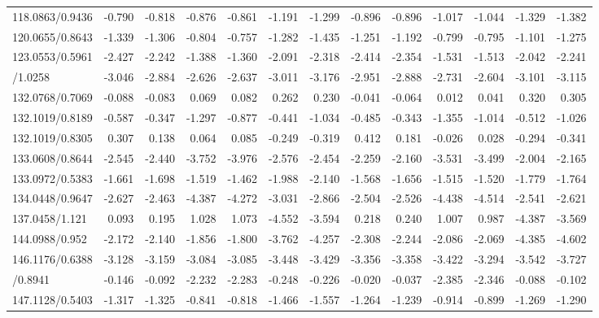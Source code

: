 \documentclass[]{elsarticle} %
\begin{document}
\begin{table}[H]
{\begin{tabular}[t]{lrrrrrrrrrrrr}
\rowcolor{gray!6}  118.0863/0.9436 & -0.790 & -0.818 & -0.876 & -0.861 & -1.191 & -1.299 & -0.896 & -0.896 & -1.017 & -1.044 & -1.329 & -1.382\\
120.0655/0.8643 & -1.339 & -1.306 & -0.804 & -0.757 & -1.282 & -1.435 & -1.251 & -1.192 & -0.799 & -0.795 & -1.101 & -1.275\\
\rowcolor{gray!6}  123.0553/0.5961 & -2.427 & -2.242 & -1.388 & -1.360 & -2.091 & -2.318 & -2.414 & -2.354 & -1.531 & -1.513 & -2.042 & -2.241\\
\addlinespace
132.0655/1.0258 & -3.046 & -2.884 & -2.626 & -2.637 & -3.011 & -3.176 & -2.951 & -2.888 & -2.731 & -2.604 & -3.101 & -3.115\\
\rowcolor{gray!6}  132.0768/0.7069 & -0.088 & -0.083 & 0.069 & 0.082 & 0.262 & 0.230 & -0.041 & -0.064 & 0.012 & 0.041 & 0.320 & 0.305\\
132.1019/0.8189 & -0.587 & -0.347 & -1.297 & -0.877 & -0.441 & -1.034 & -0.485 & -0.343 & -1.355 & -1.014 & -0.512 & -1.026\\
\rowcolor{gray!6}  132.1019/0.8305 & 0.307 & 0.138 & 0.064 & 0.085 & -0.249 & -0.319 & 0.412 & 0.181 & -0.026 & 0.028 & -0.294 & -0.341\\
133.0608/0.8644 & -2.545 & -2.440 & -3.752 & -3.976 & -2.576 & -2.454 & -2.259 & -2.160 & -3.531 & -3.499 & -2.004 & -2.165\\
\addlinespace
\rowcolor{gray!6}  133.0972/0.5383 & -1.661 & -1.698 & -1.519 & -1.462 & -1.988 & -2.140 & -1.568 & -1.656 & -1.515 & -1.520 & -1.779 & -1.764\\
134.0448/0.9647 & -2.627 & -2.463 & -4.387 & -4.272 & -3.031 & -2.866 & -2.504 & -2.526 & -4.438 & -4.514 & -2.541 & -2.621\\
\rowcolor{gray!6}  137.0458/1.121 & 0.093 & 0.195 & 1.028 & 1.073 & -4.552 & -3.594 & 0.218 & 0.240 & 1.007 & 0.987 & -4.387 & -3.569\\
144.0988/0.952 & -2.172 & -2.140 & -1.856 & -1.800 & -3.762 & -4.257 & -2.308 & -2.244 & -2.086 & -2.069 & -4.385 & -4.602\\
\rowcolor{gray!6}  146.1176/0.6388 & -3.128 & -3.159 & -3.084 & -3.085 & -3.448 & -3.429 & -3.356 & -3.358 & -3.422 & -3.294 & -3.542 & -3.727\\
\addlinespace
147.0764/0.8941 & -0.146 & -0.092 & -2.232 & -2.283 & -0.248 & -0.226 & -0.020 & -0.037 & -2.385 & -2.346 & -0.088 & -0.102\\
\rowcolor{gray!6}  147.1128/0.5403 & -1.317 & -1.325 & -0.841 & -0.818 & -1.466 & -1.557 & -1.264 & -1.239 & -0.914 & -0.899 & -1.269 & -1.290\\

\end{tabular}}
\end{table}
\end{document}
